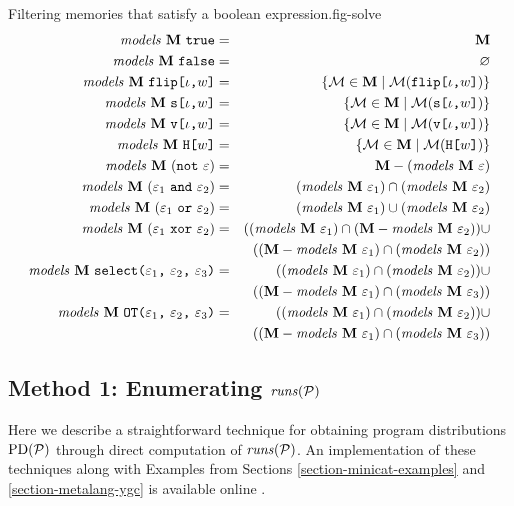 \begin{fpfig}[t]{Filtering memories that satisfy a boolean expression.}{fig-solve}
\begin{eqnarray*}
\solve{\stores}{\etrue} &=& \stores\\
\solve{\stores}{\efalse} &=& \varnothing\\
\solve{\stores}{\flip{\cid}{w}} &=& \{ \store \in \stores \mid \store(\flip{\cid}{w}) \} \\
\solve{\stores}{\secret{\cid}{w}} &=& \{ \store \in \stores \mid \store(\secret{\cid}{w}) \} \\
\solve{\stores}{\view{\cid}{w}} &=& \{ \store \in \stores \mid \store(\view{\cid}{w}) \} \\
\solve{\stores}{\oracle{w}} &=& \{ \store \in \stores \mid \store(\oracle{w}) \} \\
\solve{\stores}{(\enot\ \be)} &=& \stores - (\solve{\stores}{\be})\\
\solve{\stores}{(\be_1\ \eand\ \be_2)} &=& (\solve{\stores}{\be_1}) \cap (\solve{\stores}{\be_2}) \\
\solve{\stores}{(\be_1\ \eor\ \be_2)} &=& (\solve{\stores}{\be_1}) \cup (\solve{\stores}{\be_2}) \\
\solve{\stores}{(\be_1\ \exor\ \be_2)} &=&
 ((\solve{\stores}{\be_1}) \cap (\stores - \solve{\stores}{\be_2})) \cup\\
 && ((\stores - \solve{\stores}{\be_1}) \cap (\solve{\stores}{\be_2})) \\
\solve{\stores}{\select{\be_1}{\be_2}{\be_3}} &=&
 ((\solve{\stores}{\be_1}) \cap (\solve{\stores}{\be_2})) \cup \\
 && ((\stores - \solve{\stores}{\be_1}) \cap (\solve{\stores}{\be_3})) \\
\solve{\stores}{\OT{\be_1}{\be_2}{\be_3}} &=&
 ((\solve{\stores}{\be_1}) \cap (\solve{\stores}{\be_2})) \cup\\
 && ((\stores - \solve{\stores}{\be_1}) \cap (\solve{\stores}{\be_3}))
\end{eqnarray*}
\end{fpfig}

\subsection{Method 1: Enumerating $\runs(\prog)$}

Here we describe a straightforward technique for obtaining program
distributions $\progd(\prog)$ through direct computation of
$\runs(\prog)$. An implementation of these techniques along with
Examples from Sections \ref{section-minicat-examples} and
\ref{section-metalang-ygc} is available online \cite{XXX}.

